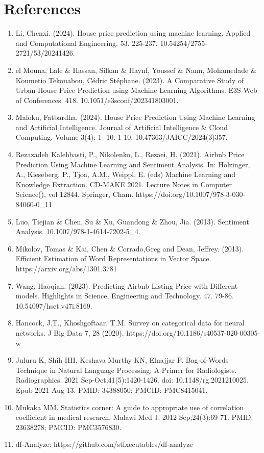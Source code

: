 \documentclass[a4paper,12pt]{article}
\begin{document}
\newpage
\sloppy
\section*{References}
\begin{enumerate}
  \item Li, Chenxi. (2024). House price prediction using machine learning. Applied and Computational Engineering. 53. 225-237. 10.54254/2755-2721/53/20241426.
  \item el Mouna, Lale \& Hassan, Silkan \& Haynf, Youssef \& Nann, Mohamedade \& Koumetio Tekouabou, Cédric Stéphane. (2023). A Comparative Study of Urban House Price Prediction using Machine Learning Algorithms. E3S Web of Conferences. 418. 10.1051/e3sconf/202341803001.
  \item Maloku, Fatbardha. (2024). House Price Prediction Using Machine Learning and Artificial Intelligence. Journal of Artificial Intelligence \& Cloud Computing. Volume 3(4): 1- 10. 1-10. 10.47363/JAICC/2024(3)357.
  \item Rezazadeh Kalehbasti, P., Nikolenko, L., Rezaei, H. (2021). Airbnb Price Prediction Using Machine Learning and Sentiment Analysis. In: Holzinger, A., Kieseberg, P., Tjoa, A.M., Weippl, E. (eds) Machine Learning and Knowledge Extraction. CD-MAKE 2021. Lecture Notes in Computer Science(), vol 12844. Springer, Cham. https://doi.org/10.1007/978-3-030-84060-0\_11
  \item Luo, Tiejian \& Chen, Su \& Xu, Guandong \& Zhou, Jia. (2013). Sentiment Analysis. 10.1007/978-1-4614-7202-5\_4.
  \item Mikolov, Tomas \& Kai, Chen \& Corrado,Greg and Dean, Jeffrey. (2013). Efficient Estimation of Word Representations in Vector Space. https://arxiv.org/abs/1301.3781
  \item Wang, Haoqian. (2023). Predicting Airbnb Listing Price with Different models. Highlights in Science, Engineering and Technology. 47. 79-86. 10.54097/hset.v47i.8169.
  \item Hancock, J.T., Khoshgoftaar, T.M. Survey on categorical data for neural networks. J Big Data 7, 28 (2020). https://doi.org/10.1186/s40537-020-00305-w
  \item Juluru K, Shih HH, Keshava Murthy KN, Elnajjar P. Bag-of-Words Technique in Natural Language Processing: A Primer for Radiologists. Radiographics. 2021 Sep-Oct;41(5):1420-1426. doi: 10.1148/rg.2021210025. Epub 2021 Aug 13. PMID: 34388050; PMCID: PMC8415041.
  \item Mukaka MM. Statistics corner: A guide to appropriate use of correlation coefficient in medical research. Malawi Med J. 2012 Sep;24(3):69-71. PMID: 23638278; PMCID: PMC3576830.
  \item df-Analyze: https://github.com/stfxecutables/df-analyze
\end{enumerate}
\end{document}
